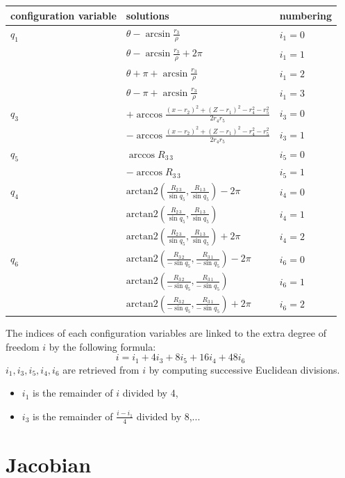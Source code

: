 \documentclass{article}
\begin{document}
\begin{tabular}{|l|l|l|}
  \hline
  configuration variable & solutions & numbering \\
  \hline
  $q_1$ & $\theta - \arcsin \frac{r_3}{\rho}$ & $i_1=0$\\
   & $\theta - \arcsin \frac{r_3}{\rho} + 2\pi$ & $i_1=1$\\
   & $\theta + \pi + \arcsin\frac{r_3}{\rho}$& $i_1=2$ \\
   & $\theta - \pi + \arcsin\frac{r_3}{\rho}$& $i_1=3$\\
  \hline
  $q_3$ & $+ \arccos \frac{(x-r_2)^2 + (Z-r_1)^2 - r_4^2 - r_5^2}{2r_4r_5}$ & $i_3=0$\\
  &$- \arccos \frac{(x-r_2)^2 + (Z-r_1)^2 - r_4^2 - r_5^2}{2r_4r_5}$ & $i_3=1$ \\
  \hline
  $q_5$ & $\arccos R_{3\,3}$ & $i_5 =0$ \\
  & $-\arccos R_{3\,3}$ & $i_5=1$ \\
  \hline
  $q_4$ & $\mbox{arctan2}(\frac{R_{2\,3}}{\sin q_5}, \frac{R_{1\,3}}{\sin q_5}) -2\pi$ & $i_4=0$ \\
        & $\mbox{arctan2}(\frac{R_{2\,3}}{\sin q_5}, \frac{R_{1\,3}}{\sin q_5})$ & $i_4=1$\\
        & $\mbox{arctan2}(\frac{R_{2\,3}}{\sin q_5}, \frac{R_{1\,3}}{\sin q_5}) + 2\pi$ & $i_4=2$ \\
  \hline
  $q_6$ &$\mbox{arctan2}(\frac{R_{3\,2}}{-\sin q_5}, \frac{R_{3\,1}}{-\sin q_5}) -2\pi$ & $i_6=0$ \\
        &$\mbox{arctan2}(\frac{R_{3\,2}}{-\sin q_5}, \frac{R_{3\,1}}{-\sin q_5})$ & $i_6=1$ \\
  &$\mbox{arctan2}(\frac{R_{3\,2}}{-\sin q_5}, \frac{R_{3\,1}}{-\sin q_5}) + 2\pi$ & $i_6=2$ \\
  \hline
\end{tabular}
The indices of each configuration variables are linked to the extra degree of freedom $i$ by the
following formula:
$$
i = i_1 + 4 i_3 + 8 i_5 + 16 i_4 + 48 i_6
$$
$i_1,i_3,i_5,i_4,i_6$ are retrieved from $i$ by computing successive Euclidean divisions.
\begin{itemize}
\item $i_1$ is the remainder of $i$ divided by 4,
\item $i_3$ is the remainder of $\frac{i-i_1}{4}$ divided by 8,...
\end{itemize}

\section{Jacobian}
\end{document}
